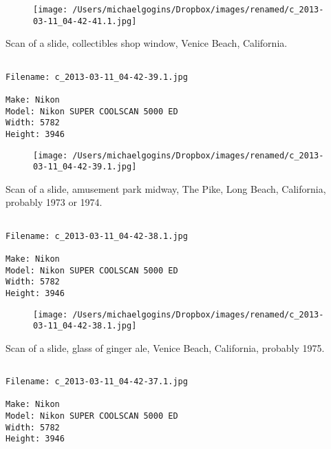 \documentclass[11pt,letter,DIV=14,paper=landscape]{scrbook}
\begin{document}
\begin{figure}
\texttt{[image: /Users/michaelgogins/Dropbox/images/renamed/c\_2013-03-11\_04-42-41.1.jpg]}
\end{figure}
    
\clearpage
\noindent Scan of a slide, collectibles shop window, Venice Beach, California.
\noindent
\begin{lstlisting}

Filename: c_2013-03-11_04-42-39.1.jpg

Make: Nikon
Model: Nikon SUPER COOLSCAN 5000 ED
Width: 5782
Height: 3946
\end{lstlisting}
\clearpage

\begin{figure}
\texttt{[image: /Users/michaelgogins/Dropbox/images/renamed/c\_2013-03-11\_04-42-39.1.jpg]}
\end{figure}
    
\clearpage
\noindent Scan of a slide, amusement park midway, The Pike, Long Beach, California, probably 1973 or 1974.
\noindent
\begin{lstlisting}

Filename: c_2013-03-11_04-42-38.1.jpg

Make: Nikon
Model: Nikon SUPER COOLSCAN 5000 ED
Width: 5782
Height: 3946
\end{lstlisting}
\clearpage

\begin{figure}
\texttt{[image: /Users/michaelgogins/Dropbox/images/renamed/c\_2013-03-11\_04-42-38.1.jpg]}
\end{figure}
    
\clearpage
\noindent Scan of a slide, glass of ginger ale, Venice Beach, California, probably 1975.
\noindent
\begin{lstlisting}

Filename: c_2013-03-11_04-42-37.1.jpg

Make: Nikon
Model: Nikon SUPER COOLSCAN 5000 ED
Width: 5782
Height: 3946
\end{lstlisting}
\clearpage
\end{document}
